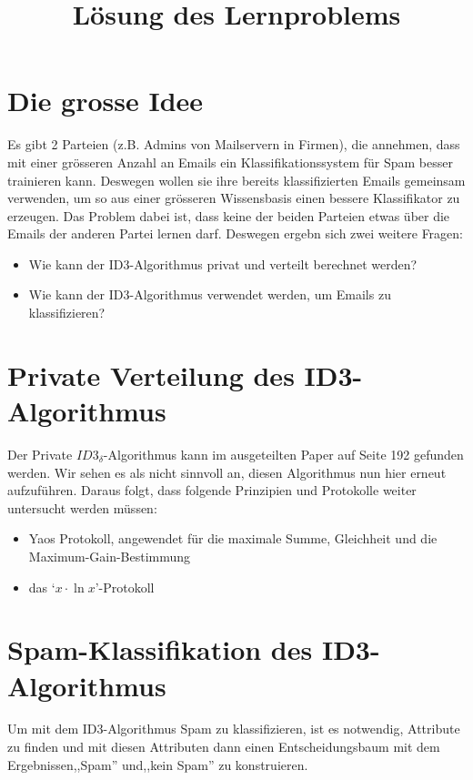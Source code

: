 \documentclass[12pt]{article}
\title{L\"osung des Lernproblems}
\begin{document}
\section{Die grosse Idee}
Es gibt 2 Parteien (z.B. Admins von Mailservern in Firmen), die annehmen, dass
mit einer gr\"osseren Anzahl an Emails ein Klassifikationssystem f\"ur Spam besser
trainieren kann. Deswegen wollen sie ihre bereits klassifizierten Emails
gemeinsam verwenden, um so aus einer gr\"osseren Wissensbasis einen bessere
Klassifikator zu erzeugen.
Das Problem dabei ist, dass keine der beiden Parteien etwas \"uber die Emails der
anderen Partei lernen darf. Deswegen ergebn sich zwei weitere Fragen: 
\begin{itemize}
 \item Wie kann der ID3-Algorithmus privat und verteilt berechnet werden?
 \item Wie kann der ID3-Algorithmus verwendet werden, um Emails zu klassifizieren?
\end{itemize}
\section{Private Verteilung des ID3-Algorithmus}
Der Private $ID3_{\delta}$-Algorithmus kann im ausgeteilten Paper auf Seite 192
gefunden werden. Wir sehen es als nicht sinnvoll an, diesen Algorithmus nun hier
erneut aufzuf\"uhren. Daraus folgt, dass folgende Prinzipien und Protokolle
weiter untersucht werden m\"ussen:

\begin{itemize}
 \item Yaos Protokoll, angewendet f\"ur die maximale Summe, Gleichheit und 
   die Maximum-Gain-Bestimmung
 \item das `\(x \cdot \ln x\)'-Protokoll
\end{itemize}

\section{Spam-Klassifikation des ID3-Algorithmus}
Um mit dem ID3-Algorithmus Spam zu klassifizieren, ist es notwendig, Attribute
zu finden und mit diesen Attributen dann einen Entscheidungsbaum mit dem
Ergebnissen,,Spam'' und,,kein Spam'' zu konstruieren.
\end{document}
